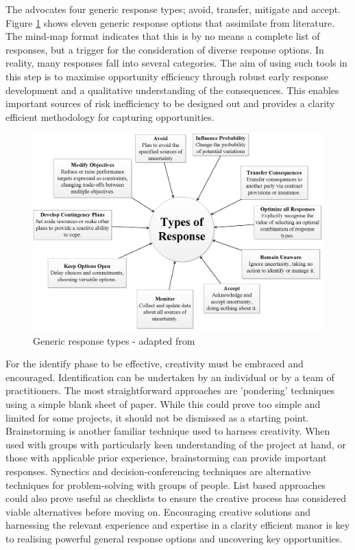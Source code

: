 The \citet{pmi2013} advocates four generic response types; avoid, transfer, mitigate and accept.
Figure \ref{Figure:ResponseTypes} shows eleven generic response options that \citet{chapman} assimilate from literature.
The mind-map format indicates that this is by no means a complete list of responses, but a trigger for the consideration of diverse response options.
In reality, many responses fall into several categories.
The aim of using such tools in this step is to maximise opportunity efficiency through robust early response development and a qualitative understanding of the consequences. 
This enables important sources of risk inefficiency to be designed out and provides a clarity efficient methodology for capturing opportunities.

\begin{figure}[!h]
  \centering
    \includegraphics[width = \textwidth]{./Figures/ResponseTypes.png} 
\caption{Generic response types - adapted from \cite{chapman}}
\label{Figure:ResponseTypes}
\end{figure}

For the identify phase to be effective, creativity must be embraced and encouraged.
Identification can be undertaken by an individual or by a team of practitioners.
The most straightforward approaches are 'pondering' techniques using a simple blank sheet of paper.
While this could prove too simple and limited for some projects, it should not be dismissed as a starting point.
Brainstorming is another familiar technique used to harness creativity.
When used with groups with particularly keen understanding of the project at hand, or those with applicable prior experience, brainstorming can provide important responses.
Synectics \citep{gordon1961synectics} and decision-conferencing techniques \citep{finlay1991review} are alternative techniques for problem-solving with groups of people.
List based approaches could also prove useful as checklists to ensure the creative process has considered viable alternatives before moving on.
Encouraging creative solutions and harnessing the relevant experience and expertise in a clarity efficient manor is key to realising powerful general response options and uncovering key opportunities.


